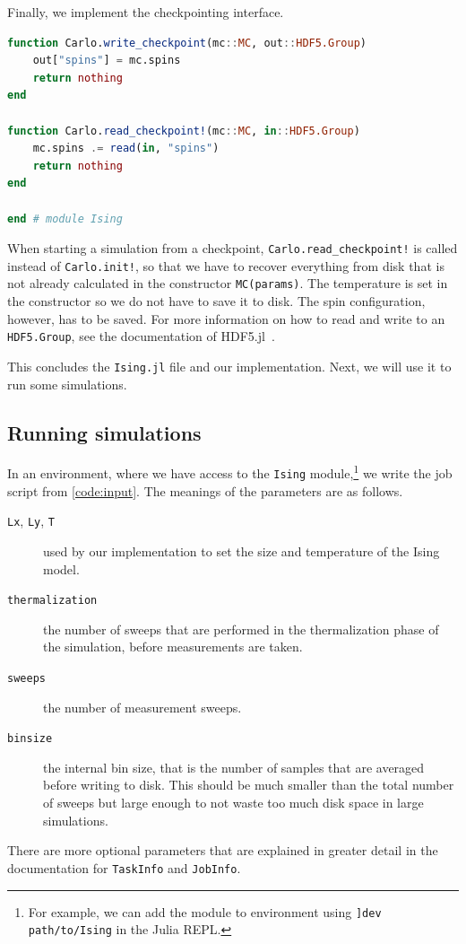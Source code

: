 \documentclass{SciPost}
\begin{document}
Finally, we implement the checkpointing interface.
\begin{lstlisting}[language=julia]
function Carlo.write_checkpoint(mc::MC, out::HDF5.Group)
    out["spins"] = mc.spins
    return nothing
end

function Carlo.read_checkpoint!(mc::MC, in::HDF5.Group)
    mc.spins .= read(in, "spins")
    return nothing
end

end # module Ising
\end{lstlisting}
When starting a simulation from a checkpoint, \texttt{Carlo.read\_{}checkpoint!} is called instead of \texttt{Carlo.init!}, so that we have to recover everything from disk that is not already calculated in the constructor \texttt{MC(params)}. The temperature is set in the constructor so we do not have to save it to disk. The spin configuration, however, has to be saved. For more information on how to read and write to an \texttt{HDF5.Group}, see the documentation of HDF5.jl~\cite{HDF5}.

This concludes the \texttt{Ising.jl} file and our implementation. Next, we will use it to run some simulations.

\subsection{Running simulations}
In an environment, where we have access to the \texttt{Ising} module,\footnote{For example, we can add the module to environment using \texttt{]dev path/to/Ising} in the Julia REPL.} we write the job script from \cref{code:input}. The meanings of the parameters are as follows.

\begin{description}
\item[\texttt{Lx}, \texttt{Ly}, \texttt{T}] used by our implementation to set the size and temperature of the Ising model.
\item[\texttt{thermalization}] the number of sweeps that are performed in the thermalization phase of the simulation, before measurements are taken.
\item[\texttt{sweeps}] the number of measurement sweeps.
\item[\texttt{binsize}] the internal bin size, that is the number of samples that are averaged before writing to disk. This should be much smaller than the total number of sweeps but large enough to not waste too much disk space in large simulations.
\end{description}
There are more optional parameters that are explained in greater detail in the documentation for \texttt{TaskInfo} and \texttt{JobInfo}.
\end{document}
